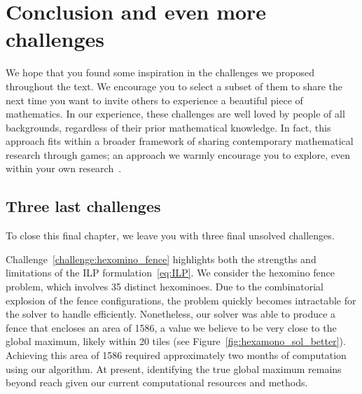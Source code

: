 \documentclass{amsart}
\theoremstyle{definition}
\theoremstyle{remark}
\begin{document}
	\section{Conclusion and even more challenges}
	
	We hope that you found some inspiration in the challenges we proposed throughout the text. We encourage you to select a subset of them to share the next time you want to invite others to experience a beautiful piece of mathematics. In our experience, these challenges are well loved by people of all backgrounds, regardless of their prior mathematical knowledge. In fact, this approach fits within a broader framework of sharing contemporary mathematical research through games; an approach we warmly encourage you to explore, even within your own research~\cite{LRRR24}.
	
	
	
	
	
	\subsection{Three last challenges}
	To close this final chapter, we leave you with three final unsolved challenges.
	
	Challenge~\ref{challenge:hexomino_fence} highlights both the strengths and limitations of the ILP formulation~\eqref{eq:ILP}. We consider the hexomino fence problem, which involves 35 distinct hexominoes. Due to the combinatorial explosion of the fence configurations, the problem quickly becomes intractable for the solver to handle efficiently. Nonetheless, our solver was able to produce a fence that encloses an area of  1586, a value we believe to be very close to the global maximum, likely within 20 tiles (see Figure~\ref{fig:hexamono_sol_better}). Achieving this area of 1586 required approximately two months of computation using our algorithm. At present, identifying the true global maximum remains beyond reach given our current computational resources and methods. 
	
\end{document}
